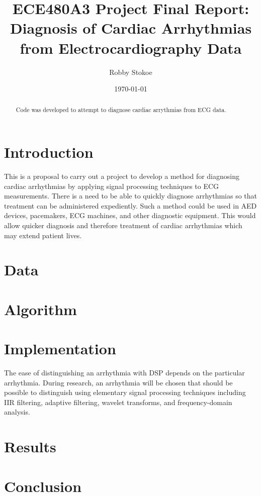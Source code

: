 \documentclass[12pt,letter]{article}
\title{ECE480A3 Project Final Report: Diagnosis of Cardiac Arrhythmias from
Electrocardiography Data}
\author{Robby Stokoe}
\date{\today}
\begin{document}
\maketitle

\begin{abstract}
    Code was developed to attempt to diagnose cardiac arrythmias from ECG data.  
\end{abstract}

\section{Introduction} 
This is a proposal to carry out a project to develop a method for diagnosing
cardiac arrhythmias by applying signal processing techniques to ECG
measurements.  There is a need to be able to quickly diagnose arrhythmias so
that treatment can be administered expediently.  Such a method could be used in
AED devices, pacemakers, ECG machines, and other diagnostic equipment.  This
would allow quicker diagnosis and therefore treatment of cardiac arrhythmias
which may extend patient lives.  

\section{Data}

\section{Algorithm}

\section{Implementation}
The ease of distinguishing an arrhythmia with DSP depends on the particular
arrhythmia.  During research, an arrhythmia will be chosen that should be
possible to distinguish using elementary signal processing techniques including
IIR filtering, adaptive filtering, wavelet transforms, and frequency-domain
analysis.  

\section{Results}

\section{Conclusion}

\begin{thebibliography}{99}

\end{thebibliography}
\end{document}

